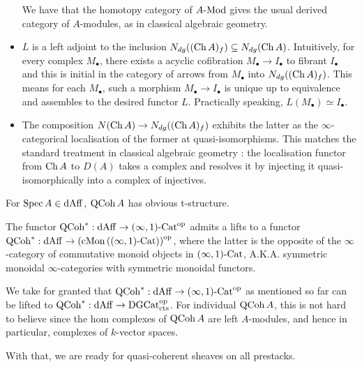 \documentclass[./main.tex]{subfiles}
\begin{document}
\begin{rmk}
\begin{itemize}
    We have that the homotopy category of $A\text{-}\mathrm{Mod}$ gives the
    usual derived category of $A$-modules, as in classical algebraic geometry.
    \item $L$ is a left adjoint to the inclusion 
    $N_{dg}((\mathrm{Ch}\,A)_f) \subseteq N_{dg}(\mathrm{Ch}\,A)$.
    Intuitively, for every complex $M_\bullet$, 
    there exists a acyclic cofibration $M_\bullet \to I_\bullet$ 
    to fibrant $I_\bullet$
    and this is initial in the category of arrows from 
    $M_\bullet$ into $N_{dg}((\mathrm{Ch}\,A)_f)$.
    \cite[Prop 1.3.5.12]{Lurie-HA}
    This means for each $M_\bullet$, 
    such a morphism $M_\bullet \to I_\bullet$ is unique up to equivalence
    and assembles to the desired functor $L$.
    Practically speaking, $L(M_\bullet) \simeq I_\bullet$.
    \item The composition $N(\mathrm{Ch}\, A) \to N_{dg}((\mathrm{Ch}\, A)_f)$
    exhibits the latter as the $\infty$-categorical localisation 
    of the former at quasi-isomorphisms.
    \cite[Prop 1.3.5.15]{Lurie-HA}
    This matches the standard treatment in classical algebraic geometry : 
    the localisation functor from $\mathrm{Ch}\, A$ to $D(A)$
    takes a complex and resolves it by injecting it
    quasi-isomorphically into a complex of injectives.
  \end{itemize}
\end{rmk}

\begin{rmk}
  For $\mathrm{Spec}\,A \in \mathrm{dAff}$, $\mathrm{QCoh}\,A$ has obvious t-structure.
\end{rmk}

\begin{prop}
  
  The functor $\mathrm{QCoh}^* : \mathrm{dAff} \to (\infty,1)\text{-}\mathrm{Cat}^{\mathrm{op}}$
  admits a lifts to a functor $\mathrm{QCoh}^* : \mathrm{dAff} \to 
  \left(\mathrm{cMon}\left((\infty,1)\text{-}\mathrm{Cat}\right)\right)^{\mathrm{op}}$,
  where the latter is the opposite of 
  the $\infty$-category of commutative monoid objects
  in $(\infty,1)\text{-}\mathrm{Cat}$, A.K.A. symmetric monoidal $\infty$-categories
  with symmetric monoidal functors.

  \cite[Prop 4.5.3.1]{Lurie-HA}
\end{prop}

\begin{rmk}
  
  We take for granted that $\mathrm{QCoh}^* : \mathrm{dAff} \to (\infty,1)\text{-}\mathrm{Cat}^{\mathrm{op}}$ 
  as mentioned so far
  can be lifted to $\mathrm{QCoh}^* : \mathrm{dAff} \to \mathrm{DGCat}_{\mathrm{cts}}^{\mathrm{op}}$.
  For individual $\mathrm{QCoh}\,A$,
  this is not hard to believe since the hom complexes of $\mathrm{QCoh}\,A$
  are left $A$-modules, and hence in particular,
  complexes of $k$-vector spaces.

  With that, 
  we are ready for quasi-coherent sheaves on all prestacks.
\end{rmk}
\end{document}
